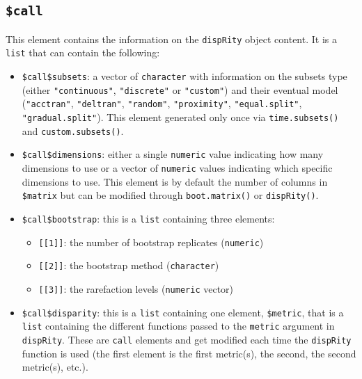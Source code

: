 \documentclass[]{book}
\providecommand{\tightlist}{%
  \setlength{\itemsep}{0pt}\setlength{\parskip}{0pt}}
\theoremstyle{definition}
\theoremstyle{definition}
\theoremstyle{remark}
\begin{document}
\subsection{\texorpdfstring{\texttt{\$call}}{\$call}}\label{call}

This element contains the information on the \texttt{dispRity} object
content. It is a \texttt{list} that can contain the following:

\begin{itemize}
\tightlist
\item
  \texttt{\$call\$subsets}: a vector of \texttt{character} with
  information on the subsets type (either \texttt{"continuous"},
  \texttt{"discrete"} or \texttt{"custom"}) and their eventual model
  (\texttt{"acctran"}, \texttt{"deltran"}, \texttt{"random"},
  \texttt{"proximity"}, \texttt{"equal.split"},
  \texttt{"gradual.split"}). This element generated only once via
  \texttt{time.subsets()} and \texttt{custom.subsets()}.
\item
  \texttt{\$call\$dimensions}: either a single \texttt{numeric} value
  indicating how many dimensions to use or a vector of \texttt{numeric}
  values indicating which specific dimensions to use. This element is by
  default the number of columns in \texttt{\$matrix} but can be modified
  through \texttt{boot.matrix()} or \texttt{dispRity()}.
\item
  \texttt{\$call\$bootstrap}: this is a \texttt{list} containing three
  elements:

  \begin{itemize}
  \tightlist
  \item
    \texttt{{[}{[}1{]}{]}}: the number of bootstrap replicates
    (\texttt{numeric})
  \item
    \texttt{{[}{[}2{]}{]}}: the bootstrap method (\texttt{character})
  \item
    \texttt{{[}{[}3{]}{]}}: the rarefaction levels (\texttt{numeric}
    vector)
  \end{itemize}
\item
  \texttt{\$call\$disparity}: this is a \texttt{list} containing one
  element, \texttt{\$metric}, that is a \texttt{list} containing the
  different functions passed to the \texttt{metric} argument in
  \texttt{dispRity}. These are \texttt{call} elements and get modified
  each time the \texttt{dispRity} function is used (the first element is
  the first metric(s), the second, the second metric(s), etc.).
\end{itemize}
\end{document}
